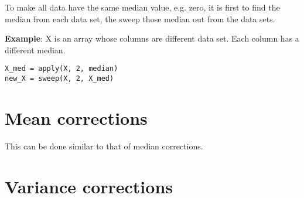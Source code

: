 To make all data have the same median value, e.g. zero, it is first to
find the median from each data set, the sweep those median out from
the data sets. 

{\bf Example}: X is an array whose columns are different data
set. Each column has a different median.

\begin{lstlisting}
X_med = apply(X, 2, median)
new_X = sweep(X, 2, X_med)
\end{lstlisting}

\section{Mean corrections}
\label{sec:mean-corrections}

This can be done similar to that of median corrections.

\section{Variance corrections}
\label{sec:variance-corrections}



